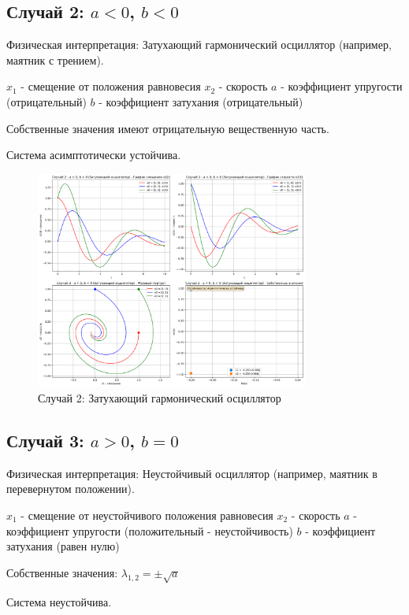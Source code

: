 \subsection{Случай 2: $a < 0$, $b < 0$}

Физическая интерпретация: Затухающий гармонический осциллятор (например, маятник с трением).

$x_1$ - смещение от положения равновесия
$x_2$ - скорость
$a$ - коэффициент упругости (отрицательный)
$b$ - коэффициент затухания (отрицательный)

Собственные значения имеют отрицательную вещественную часть.

Система асимптотически устойчива.

\begin{figure}[h!]
\centering
\includegraphics[width=0.8\textwidth]{images/task3/случай_2_-_a_<_0_b_<_0_затухающий_осциллятор.png}
\caption{Случай 2: Затухающий гармонический осциллятор}
\label{fig:oscillator2}
\end{figure}

\subsection{Случай 3: $a > 0$, $b = 0$}

Физическая интерпретация: Неустойчивый осциллятор (например, маятник в перевернутом положении).

$x_1$ - смещение от неустойчивого положения равновесия
$x_2$ - скорость
$a$ - коэффициент упругости (положительный - неустойчивость)
$b$ - коэффициент затухания (равен нулю)

Собственные значения: $\lambda_{1,2} = \pm \sqrt{a}$

Система неустойчива.

